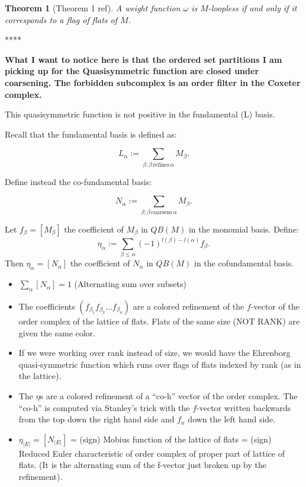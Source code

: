\documentclass[12pt]{amsart}
\newtheorem{theorem}[definition]{Theorem}
\begin{document}
\begin{theorem}[Theorem 1 ref]
A weight function $\omega$ is $M$-loopless if and only if it corresponds 
to a flag of flats of $M$.
\end{theorem}


**** {\bf What I want to notice here is that the ordered set partitions I
am picking up for the Quasisymmetric function are closed under
coarsening.  The forbidden subcomplex is an order filter in the
Coxeter complex.  

This quasisymmetric function is not positive in the fundamental (L) basis.  }

Recall that the fundamental basis is defined as:

$$ L_{\alpha} := \sum_{\beta : \beta \, \textrm{refines} \, \alpha} M_{\beta}.$$


Define instead the co-fundamental basis:

$$ N_{\alpha} := \sum_{\beta : \beta \, \textrm{coarsens} \, \alpha} M_{\beta}.$$


Let $f_{\beta} = [M_{\beta}]$ the coefficient of $M_{\beta}$ in
$QB(M)$ in the monomial basis.  Define: 
$$\eta_{\alpha} := \sum_{\beta \leq \alpha} (-1)^{l(\beta)-l(\alpha)}f_{\beta}.$$
Then $\eta_{\alpha} = [N_{\alpha}]$ the coefficient of $N_{\alpha}$ in $QB(M)$ in the cofundamental basis.

\begin{itemize}

\item $\sum_{\alpha} [N_{\alpha}] = 1$ (Alternating sum over subsets)

\item The coefficients $(f_{\beta_1}f_{\beta_2} \dots f_{\beta_n})$ are
a colored refinement of the $f$-vector of the order complex of the
lattice of flats. Flats of the same size (NOT RANK) are given the same
color.

\item If we were working over rank instead of size, we would have the Ehrenborg quasi-symmetric function which runs over flags of flats indexed by rank (as in the lattice).

\item The $\eta$s are a colored refinement of a ``co-h'' vector of the
order complex.  The ``co-h'' is computed via Stanley's trick with the
$f$-vector written backwards from the top down the right hand side and
$f_n$ down the left hand side.

\item $\eta_{|E|} = [N_{|E|}]$ = (sign) Mobius function of the lattice
of flats = (sign) Reduced Euler characteristic of order complex of
proper part of lattice of flats. (It is the alternating sum of the
f-vector just broken up by the refinement).

\end{itemize}
\end{document}
